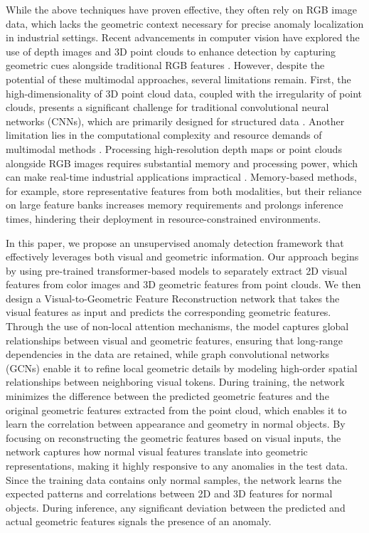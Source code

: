 While the above techniques have proven effective, they often rely on RGB image data, which lacks the geometric context necessary for precise anomaly localization in industrial settings. Recent advancements in computer vision have explored the use of depth images and 3D point clouds to enhance detection by capturing geometric cues alongside traditional RGB features \cite{bergmann2023anomaly, rudolph2023asymmetric, horwitz2023back, wang2023multimodal}. However, despite the potential of these multimodal approaches, several limitations remain. First, the high-dimensionality of 3D point cloud data, coupled with the irregularity of point clouds, presents a significant challenge for traditional convolutional neural networks (CNNs), which are primarily designed for structured data \cite{hoang2025attention, wang2023multimodal, hoang2024efficient}. Another limitation lies in the computational complexity and resource demands of multimodal methods \cite{rudolph2023asymmetric, hoang2024collision}. Processing high-resolution depth maps or point clouds alongside RGB images requires substantial memory and processing power, which can make real-time industrial applications impractical \cite{horwitz2023back, hoang2024object}. Memory-based methods, for example, store representative features from both modalities, but their reliance on large feature banks increases memory requirements and prolongs inference times, hindering their deployment in resource-constrained environments.

In this paper,  we propose an unsupervised anomaly detection framework that effectively leverages both visual and geometric information. Our approach begins by using pre-trained transformer-based models to separately extract 2D visual features from color images and 3D geometric features from point clouds. We then design a Visual-to-Geometric Feature Reconstruction network that takes the visual features as input and predicts the corresponding geometric features. Through the use of non-local attention mechanisms, the model captures global relationships between visual and geometric features, ensuring that long-range dependencies in the data are retained, while graph convolutional networks (GCNs) enable it to refine local geometric details by modeling high-order spatial relationships between neighboring visual tokens. During training, the network minimizes the difference between the predicted geometric features and the original geometric features extracted from the point cloud, which enables it to learn the correlation between appearance and geometry in normal objects. By focusing on reconstructing the geometric features based on visual inputs, the network captures how normal visual features translate into geometric representations, making it highly responsive to any anomalies in the test data. Since the training data contains only normal samples, the network learns the expected patterns and correlations between 2D and 3D features for normal objects. During inference, any significant deviation between the predicted and actual geometric features signals the presence of an anomaly.

